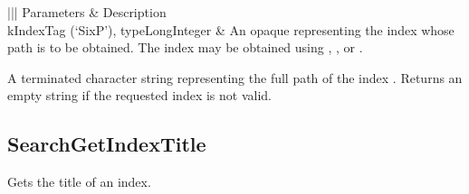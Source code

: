 \documentclass[letterpaper,12pt,english,openany,oneside]{sphinxmanual}
\begin{document}
\begin{savenotes}\sphinxattablestart
\centering
{}\label{\detokenize{IAC_API_SearchIntro:section-11}}\nobreak
\begin{tabular}[t]{|||}
\hline
\sphinxstyletheadfamily 
Parameters
&\sphinxstyletheadfamily 
Description
\\
\hline
kIndexTag (‘SixP’), typeLongInteger
&
An opaque  representing the index whose path is to be obtained. The index may be obtained using  ,  , or  .
\\
\hline
\end{tabular}
\par
\sphinxattableend\end{savenotes}


\begin{sphinxVerbatim}[commandchars=\\\{\}]
  
\end{sphinxVerbatim}

A  \sphinxhyphen{}terminated character string representing the full path of the index . Returns an empty string if the requested index is not valid.


\subsection{SearchGetIndexTitle}
\label{\detokenize{IAC_API_SearchIntro:searchgetindextitle}}
Gets the title of an index.

\label{\detokenize{IAC_API_SearchIntro:apple-event-id-7}}

\begin{sphinxVerbatim}[commandchars=\\\{\}]
 
\end{sphinxVerbatim}
\label{\detokenize{IAC_API_SearchIntro:parameters-6}}
\end{document}
